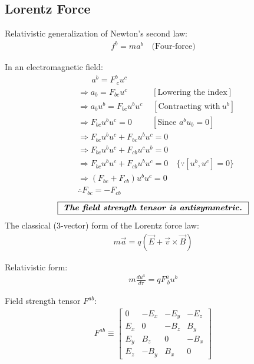 \documentclass[14pt]{article} %
\begin{document}
\subsection*{Lorentz Force}

Relativistic generalization of Newton's second law:
\begin{align*}
f^b = m a^b \quad \text{(Four-force)}
\end{align*}

In an electromagnetic field:
\begin{align*}
    &\quad~~~ a^b = F^b_{\ c} u^c \\
   &\Rightarrow a_b = F_{bc} u^c \quad \quad\quad [\text{Lowering the index}] \\
   &\Rightarrow a_b u^b = F_{bc} u^b u^c \quad~[\text{Contracting with}~u^b] \\
   &\Rightarrow F_{bc} u^b u^c = 0 \quad~~\quad[\text{Since }a^b u_b = 0] \\  
   &\Rightarrow F_{bc} u^b u^c + F_{bc} u^b u^c = 0 \\
   &\Rightarrow F_{bc} u^b u^c + F_{cb} u^c u^b = 0 \\
   &\Rightarrow F_{bc} u^b u^c + F_{cb} u^b u^c = 0 \quad\{\because [u^b,u^c]=0 \}\\
    &\Rightarrow \left(F_{bc} + F_{cb}\right) u^b u^c = 0 \\
    &\therefore F_{bc} = -F_{cb}  
\end{align*}
$$\fbox{
\textbf{\textit{The field strength tensor is antisymmetric.}}
}
$$
The classical (3-vector) form of the Lorentz force law:
\begin{align*}
m \vec{a} = q \left( \vec{E} + \vec{v} \times \vec{B} \right)
\end{align*}

Relativistic form:
\begin{align*}
m \frac{du^a}{d\tau} = q F^a_{\ b} u^b
\end{align*}

Field strength tensor $F^{ab}$:
\begin{align*}
F^{ab} \equiv
\begin{bmatrix}
0 & -E_x & -E_y & -E_z \\
E_x & 0 & -B_z & B_y \\
E_y & B_z & 0 & -B_x \\
E_z & -B_y & B_x & 0
\end{bmatrix}
\end{align*}
\end{document}
